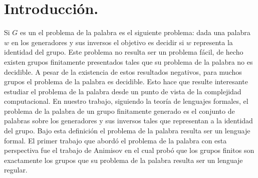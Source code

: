 \documentclass[tesis.tex]{subfiles}
\begin{document}
	\chapter*{Introducción.}
	
	Si $G$ es un \fg el problema de la palabra es el siguiente problema: dada una palabra $w$ en los generadores y sus inversos el objetivo es decidir si $w$ representa la identidad del grupo.
	Este problema no resulta ser un problema fácil, de hecho existen grupos finitamente presentados tales que su problema de la palabra no es decidible.
	A pesar de la existencia de estos resultados negativos, para muchos grupos el problema de la palabra es decidible.
	Esto hace que resulte interesante estudiar el problema de la palabra desde un punto de vista de la complejidad computacional.
	En nuestro trabajo, siguiendo la teoría de lenguajes formales, el problema de la palabra de un grupo finitamente generado es el conjunto de palabras sobre los generadores y sus inversos tales que representan a la identidad del grupo.
	Bajo esta definición el problema de la palabra resulta ser un lenguaje formal.
	El primer trabajo que abordó el problema de la palabra con esta perspectiva fue el trabajo de Animisov \cite{anisimov1971languages} en el cual probó que los grupos finitos son exactamente los grupos que su problema de la palabra resulta ser un lenguaje regular.
\end{document}
